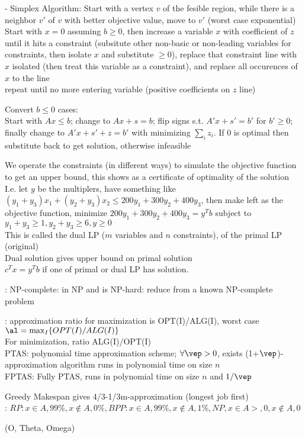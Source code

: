 \documentclass[10pt]{CheatSheet/hw}
\begin{document}
\begin{multicols*}{5}
- Simplex Algorithm: Start with a vertex $v$ of the fesible region, while there is a neighbor $v'$ of $v$ with better objective value, move to $v'$ (worst case exponential)\\
Start with $x=0$ assuming $b\ge0$, then increase a variable $x$ with  coefficient of $z$ until it hits a constraint (subsitute other non-basic or non-leading variables for constraints, then isolate $x$ and substitute $\ge0$), replace that constraint line with $x$ isolated (then treat this variable as a constraint), and replace all occurences of $x$ to the line\\
repeat until no more entering variable (positive coefficients on $z$ line)

Convert $b\le0$ cases:\\
Start with $Ax\le b$; change to $Ax+s=b$; flip signs s.t. $A'x+s'=b'$ for $b'\ge0$; finally change to $A'x+s'+z=b'$ with minimizing $\sum_i z_i$. If 0 is optimal then substitute back to get solution, otherwise infeasible

We operate the constraints (in different ways) to simulate the objective function to get an upper bound, this shows as a certificate of optimality of the solution\\
I.e. let $y$ be the multiplers, have something like $(y_1+y_3)x_1+(y_2+y_3)x_2\le 200y_1+300y_2+400y_3$, then make left as the objective function, minimize $200y_1+300y_2+400y_3=y^Tb$ subject to $y_1+y_3\ge1,y_2+y_3\ge6, y\ge0$\\
This is called the dual LP ($m$ variables and $n$ constraints), of the primal LP (original)\\
Dual solution gives upper bound on primal solution\\
$c^Tx=y^Tb$ if one of primal or dual LP has solution.

: NP-complete: in NP and is NP-hard: reduce from a known NP-complete problem

: approximation ratio for maximization is OPT(I)/ALG(I), worst case $\al=\max_I\{OPT(I)/ALG(I)\}$\\
For minimization, ratio ALG(I)/OPT(I)\\
PTAS: polynomial time approximation scheme; $\forall \vep>0$, exists (1+$\vep$)-approximation algorithm runs in polynomial time on size $n$\\
FPTAS: Fully PTAS, runs in polynomial time on size $n$ and $1/\vep$

Greedy Makespan gives 4/3-1/3m-approximation (longest job first)\\

: $RP: x\in A, 99\%, x\notin A, 0\%, BPP: x\in A, 99\%, x\notin A, 1\%, NP, x\in A>,0, x\notin A ,0$\\




\end{multicols*}

\np 
{}
(O, Theta, Omega)

\end{document}
